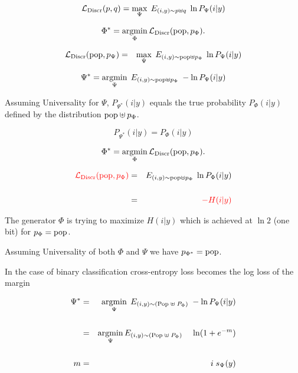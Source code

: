 {{\color{red} $${\cal L}_{\mathrm{Discr}}(p,q) = \max_\Psi\;E_{(i,y) \sim p \uplus q}\;\ln P_\Psi(i|y)$$}


$$\Phi^* = \operatorname*{argmin}_\Phi {\cal L}_{\mathrm{Discr}}(\mathrm{pop},p_\Phi).$$

\begin{eqnarray*}
{\cal L}_{\mathrm{Discr}}(\mathrm{pop},p_\Psi) & = & \max_\Psi\;E_{(i,y) \sim \mathrm{pop} \uplus p_\Phi}\;\ln P_\Psi(i|y)
\end{eqnarray*}

{\color{red} $$\Psi^* = \operatorname*{argmin}_\Psi \;E_{(i,y) \sim \mathrm{pop} \uplus p_\Phi}\;- \ln P_\Psi(i|y)$$}

Assuming Universality for $\Psi$, {\color{red} $P_{\Psi^*}(i|y)$ equals the true probability $P_\Phi(i|y)$ defined by the distribution $\mathrm{pop}\uplus p_\Phi$}.


{\color{red} $$P_{\Psi^*}(i|y) = P_\Phi(i|y)$$}


$$\Phi^* = \operatorname*{argmin}_\Phi {\cal L}_{\mathrm{Discr}}(\mathrm{pop},p_\Phi).$$

\begin{eqnarray*}
{\color{red} {\cal L}_{\mathrm{Discr}}(\mathrm{pop},p_\Phi)} & = & E_{(i,y) \sim \mathrm{pop} \uplus p_\Phi}\;\ln P_{\Phi}(i|y) \\
\\
& = & {\color{red} -H(i|y)}
\end{eqnarray*}

The generator $\Phi$ is trying to maximize $H(i|y)$ which is achieved at $\ln 2$ (one bit) for $p_\Phi = \mathrm{pop}$.

\vfill
Assuming Universality of both $\Phi$ and $\Psi$ we have {\color{red} $p_{\Phi^*} = \mathrm{pop}$}.


In the case of binary classification cross-entropy loss becomes the log loss of the margin

\begin{eqnarray*}
\Psi^* & = & \operatorname*{argmin}_\Psi \;E_{(i,y) \sim (\mathrm{Pop}\; \uplus \;P_\Phi)}\;- \ln P_\Psi(i|y) \\
\\
& = & \operatorname*{argmin}_\Psi E_{(i,y) \sim (\mathrm{Pop}\; \uplus \;P_\Phi)}\;\;\;\;\ln(1 + e^{-m}) \\
\\
m & = & i\;s_\Psi(y)
\end{eqnarray*}


}
